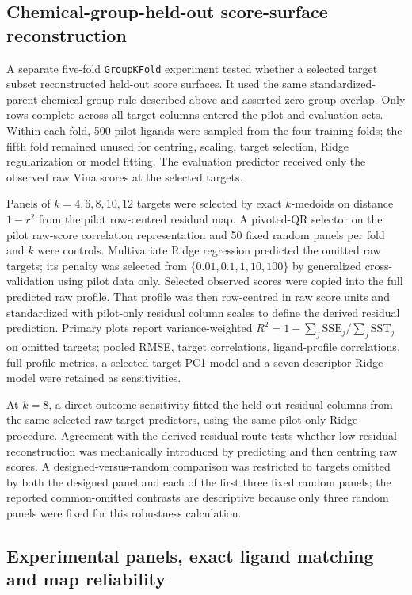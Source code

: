\subsection{Chemical-group-held-out score-surface reconstruction}

A separate five-fold \texttt{GroupKFold} experiment tested whether a selected
target subset reconstructed held-out score surfaces. It used the same
standardized-parent chemical-group rule described above and asserted zero group
overlap. Only rows complete across all target columns entered the pilot and
evaluation sets. Within each fold, 500 pilot ligands were sampled from the four
training folds; the fifth fold remained unused for centring, scaling, target
selection, Ridge regularization or model fitting. The evaluation predictor
received only the observed raw Vina scores at the selected targets.

Panels of $k=4,6,8,10,12$ targets were selected by exact $k$-medoids on distance
$1-r^2$ from the pilot row-centred residual map. A pivoted-QR selector on the
pilot raw-score correlation representation and 50 fixed random panels per fold
and $k$ were controls. Multivariate Ridge regression predicted the omitted raw
targets; its penalty was selected from $\{0.01,0.1,1,10,100\}$ by generalized
cross-validation using pilot data only. Selected observed scores were copied
into the full predicted raw profile. That profile was then row-centred in raw
score units and standardized with pilot-only residual column scales to define
the derived residual prediction. Primary plots report variance-weighted
$R^2=1-\sum_j\mathrm{SSE}_j/\sum_j\mathrm{SST}_j$ on omitted targets; pooled
RMSE, target correlations, ligand-profile correlations, full-profile metrics,
a selected-target PC1 model and a seven-descriptor Ridge model were retained as
sensitivities.

At $k=8$, a direct-outcome sensitivity fitted the held-out residual columns
from the same selected raw target predictors, using the same pilot-only Ridge
procedure. Agreement with the derived-residual route tests whether low residual
reconstruction was mechanically introduced by predicting and then centring raw
scores. A designed-versus-random comparison was restricted to targets omitted
by both the designed panel and each of the first three fixed random panels; the
reported common-omitted contrasts are descriptive because only three random
panels were fixed for this robustness calculation.

\subsection{Experimental panels, exact ligand matching and map reliability}


